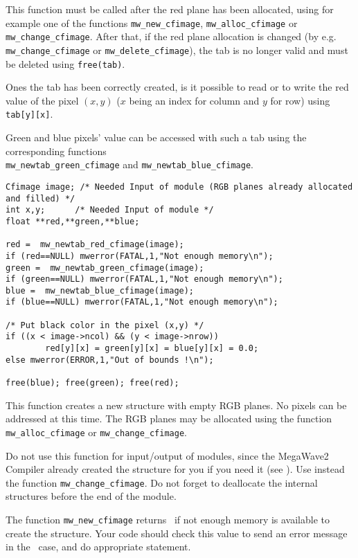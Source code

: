 This function must be called after the red plane has been allocated,
using for example one of the functions \verb+mw_new_cfimage+, 
\verb+mw_alloc_cfimage+ or \verb+mw_change_cfimage+. 
After that, if the red plane allocation is changed
(by e.g. \verb+mw_change_cfimage+ or \verb+mw_delete_cfimage+), the tab is
no longer valid and must be deleted using \verb+free(tab)+.

Ones the tab has been correctly created, is it possible to read or to
write the red value of the pixel $(x,y)$ ($x$ being an index for column and $y$
for row) using \verb+tab[y][x]+.

Green and blue pixels' value can be accessed with such a tab using 
the corresponding functions \\
\verb+mw_newtab_green_cfimage+ and \verb+mw_newtab_blue_cfimage+.

\Next
\Example
\begin{verbatim}
Cfimage image; /* Needed Input of module (RGB planes already allocated and filled) */
int x,y;      /* Needed Input of module */
float **red,**green,**blue;

red =  mw_newtab_red_cfimage(image);
if (red==NULL) mwerror(FATAL,1,"Not enough memory\n");
green =  mw_newtab_green_cfimage(image);
if (green==NULL) mwerror(FATAL,1,"Not enough memory\n");
blue =  mw_newtab_blue_cfimage(image);
if (blue==NULL) mwerror(FATAL,1,"Not enough memory\n");

/* Put black color in the pixel (x,y) */
if ((x < image->ncol) && (y < image->nrow)) 
        red[y][x] = green[y][x] = blue[y][x] = 0.0;
else mwerror(ERROR,1,"Out of bounds !\n");

free(blue); free(green); free(red);
\end{verbatim}

\newpage %
\Description
This function creates a new \cfimage structure with empty RGB planes.
No pixels can be addressed at this time.
The RGB planes may be allocated using the function \verb+mw_alloc_cfimage+ or
\verb+mw_change_cfimage+.

Do not use this function for input/output of modules, since the MegaWave2
Compiler already created the structure for you if you need it (see \volI). Use instead the function \verb+mw_change_cfimage+.
Do not forget to deallocate the internal structures before the end
of the module.

The function \verb+mw_new_cfimage+ returns \Null\ if not enough memory is available to create the structure. Your code should check this value to send an
error message in the \Null\ case, and do appropriate statement.

